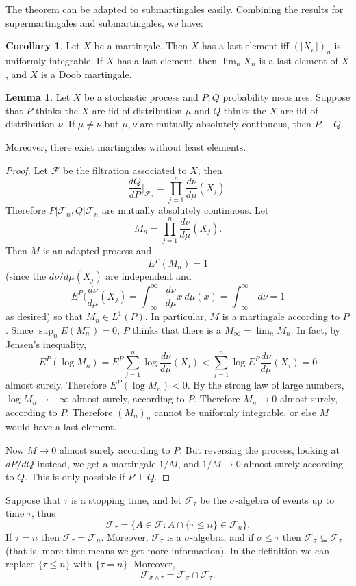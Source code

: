 \documentclass[12pt]{book}
\theoremstyle{definition}
\newtheorem{lemma}[theorem]{Lemma}
\newtheorem{corollary}[theorem]{Corollary}
\begin{document}
The theorem can be adapted to submartingales easily.
Combining the results for supermartingales and submartingales, we have:

\begin{corollary}
Let $X$ be a martingale. Then $X$ has a last element iff $(|X_n|)_n$ is uniformly integrable.
If $X$ has a last element, then $\lim_n X_n$ is a last element of $X$, and $X$ is a Doob martingale.
\end{corollary}

\begin{lemma}
Let $X$ be a stochastic process and $P,Q$ probability measures.
Suppose that $P$ thinks the $X$ are iid of distribution $\mu$ and $Q$ thinks the $X$ are iid of distribution $\nu$.
If $\mu \neq \nu$ but $\mu,\nu$ are mutually absolutely continuous, then $P \perp Q$.

Moreover, there exist martingales without least elements.
\end{lemma}
\begin{proof}
Let $\mathcal F$ be the filtration associated to $X$, then
$$\frac{dQ}{dP}|_{\mathcal F_n} = \prod_{j=1}^n \frac{d\nu}{d\mu}(X_j).$$
Therefore $P|\mathcal F_n,Q|\mathcal F_n$ are mutually absolutely continuous.
Let
$$M_n = \prod_{j=1}^n \frac{d\nu}{d\mu}(X_j).$$
Then $M$ is an adapted process and
$$E^P(M_n) = 1$$
(since the $d\nu/d\mu(X_j)$ are independent and
$$E^P(\frac{d\nu}{d\mu}(X_j) = \int_{-\infty}^\infty \frac{d\nu}{d\mu}x ~d\mu(x) = \int_{-\infty}^\infty ~d\nu = 1$$
as desired)
so that $M_n \in L^1(P)$.
In particular, $M$ is a martingale according to $P$.
Since $\sup_n E(M_n^-) = 0$, $P$ thinks that there is a $M_\infty = \lim_n M_n$.
In fact, by Jensen's inequality,
$$E^P(\log M_n) = E^P\sum_{j=1}^n \log \frac{d\nu}{d\mu}(X_i) < \sum_{j=1}^n \log E^P \frac{d\nu}{d\mu}(X_i) = 0$$
almost surely.
Therefore $E^P(\log M_n) < 0$.
By the strong law of large numbers, $\log M_n \to -\infty$ almost surely, according to $P$.
Therefore $M_n \to 0$ almost surely, according to $P$.
Therefore $(M_n)_n$ cannot be uniformly integrable, or else $M$ would have a last element.

Now $M \to 0$ almost surely according to $P$.
But reversing the process, looking at $dP/dQ$ instead, we get a martingale $1/M$, and $1/M \to 0$ almost surely according to $Q$.
This is only possible if $P \perp Q$.
\end{proof}

Suppose that $\tau$ is a stopping time, and let $\mathcal F_\tau$ be the $\sigma$-algebra of events up to time $\tau$, thus
$$\mathcal F_\tau = \{A \in \mathcal F: A \cap \{\tau \leq n\} \in \mathcal F_n\}.$$
If $\tau = n$ then $\mathcal F_\tau = \mathcal F_n$.
Moreover, $\mathcal F_\tau$ is a $\sigma$-algebra, and if $\sigma \leq \tau$ then $\mathcal F_\sigma \subseteq \mathcal F_\tau$ (that is, more time means we get more information).
In the definition we can replace $\{\tau \leq n\}$ with $\{\tau = n\}$.
Moreover,
$$\mathcal F_{\sigma \wedge \tau} = \mathcal F_\sigma \cap \mathcal F_\tau.$$
\end{document}
